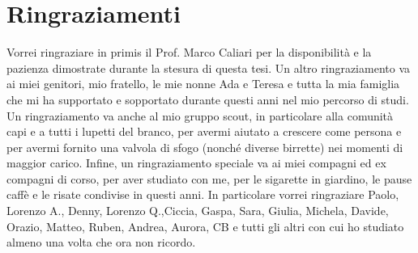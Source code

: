\documentclass[a4paper,12pt,twoside,openany]{scrbook}
\begin{document}
\chapter*{Ringraziamenti}
Vorrei ringraziare in primis il Prof. Marco Caliari per la disponibilità e la pazienza dimostrate durante la stesura di questa tesi. Un altro ringraziamento va ai miei genitori, mio fratello, le mie nonne Ada e Teresa e tutta la mia famiglia che mi ha supportato e sopportato durante questi anni nel mio percorso di studi. Un ringraziamento va anche al mio gruppo scout, in particolare alla comunità capi e a tutti i lupetti del branco, per avermi aiutato a crescere come persona e per avermi fornito una valvola di sfogo (nonché diverse birrette) nei momenti di maggior carico. Infine, un ringraziamento speciale va ai miei compagni ed ex compagni di corso, per aver studiato con me, per le sigarette in giardino, le pause caffè e le risate condivise in questi anni. In particolare vorrei ringraziare Paolo, Lorenzo A., Denny, Lorenzo Q.,Ciccia, Gaspa, Sara, Giulia, Michela, Davide, Orazio, Matteo, Ruben, Andrea, Aurora, CB e tutti gli altri con cui ho studiato almeno una volta che ora non ricordo.
\end{document}

